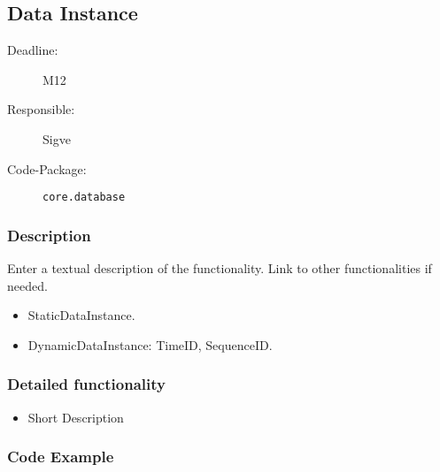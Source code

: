 \newpage
\subsection{Data Instance}
\label{Functionality:ID}

\begin{description}
\item[Deadline:] M12
\item[Responsible:] Sigve
\item[Code-Package:] \texttt{core.database}
\end{description}

\subsubsection*{Description}

Enter a textual description of the functionality. Link to other functionalities if needed. 
\begin{itemize}
\item StaticDataInstance.
\item DynamicDataInstance: TimeID, SequenceID.
\end{itemize}

\subsubsection*{Detailed functionality}

\begin{itemize}
\item Short Description
\end{itemize}

\subsubsection*{Code Example}

